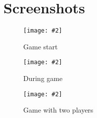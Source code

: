 \documentclass{article}
\begin{document}
\section{Screenshots}
\newcommand{\scrnshts}[3]{
	\begin{figure}[!ht]
		\centering
		\texttt{[image: \#2]}
		\caption{#1}
	\end{figure}
}

\scrnshts{Game start}{../res/1.png}{0.6}
\scrnshts{During game}{../res/2.png}{0.6}
\scrnshts{Game with two players}{../res/3.png}{0.6}

\clearpage
\printbibliography
\end{document}
